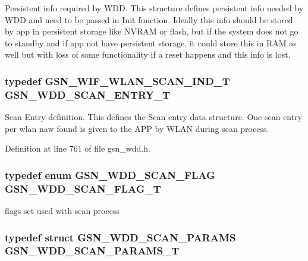 Persistent info required by WDD. This structure defines persistent info needed by WDD and need to be passed in Init function. Ideally this info should be stored by app in persistent storage like NVRAM or flash, but if the system does not go to standby and if app not have persistent storage, it could store this in RAM as well but with loss of some functionality if a reset happens and this info is lost. 

\hypertarget{a00677_gaca7e9b8176b0ff06a2cb24c84be888ed}{
\subsubsection[{GSN\_\-WDD\_\-SCAN\_\-ENTRY\_\-T}]{\setlength{\rightskip}{0pt plus 5cm}typedef {\bf GSN\_\-WIF\_\-WLAN\_\-SCAN\_\-IND\_\-T} {\bf GSN\_\-WDD\_\-SCAN\_\-ENTRY\_\-T}}}
\label{a00677_gaca7e9b8176b0ff06a2cb24c84be888ed}


Scan Entry definition. This defines the Scan entry data structure. One scan entry per wlan naw found is given to the APP by WLAN during scan process. 



Definition at line 761 of file gsn\_\-wdd.h.

\hypertarget{a00677_gad988da580b33f4a18de188de56a05736}{
\subsubsection[{GSN\_\-WDD\_\-SCAN\_\-FLAG\_\-T}]{\setlength{\rightskip}{0pt plus 5cm}typedef enum {\bf GSN\_\-WDD\_\-SCAN\_\-FLAG} {\bf GSN\_\-WDD\_\-SCAN\_\-FLAG\_\-T}}}
\label{a00677_gad988da580b33f4a18de188de56a05736}


flags set used with scan process 

\hypertarget{a00677_ga5df05c7cc3d6a8db66ec41eb7c9548e9}{
\subsubsection[{GSN\_\-WDD\_\-SCAN\_\-PARAMS\_\-T}]{\setlength{\rightskip}{0pt plus 5cm}typedef struct {\bf GSN\_\-WDD\_\-SCAN\_\-PARAMS}  {\bf GSN\_\-WDD\_\-SCAN\_\-PARAMS\_\-T}}}
\label{a00677_ga5df05c7cc3d6a8db66ec41eb7c9548e9}


